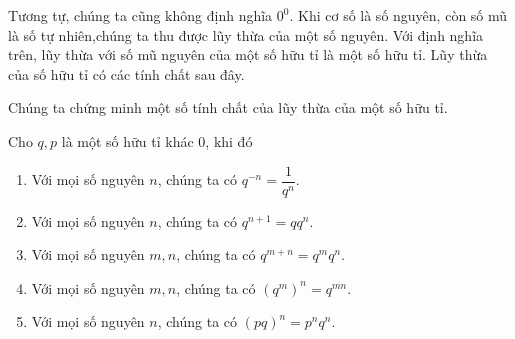 Tương tự, chúng ta cũng không định nghĩa $0^{0}$. Khi cơ số là số nguyên, còn số mũ là số tự nhiên,chúng ta thu được lũy thừa của một số nguyên. Với định nghĩa trên, lũy thừa với số mũ nguyên của một số hữu tỉ là một số hữu tỉ. Lũy thừa của số hữu tỉ có các tính chất sau đây.

Chúng ta chứng minh một số tính chất của lũy thừa của một số hữu tỉ.
\begin{theorem}
    Cho $q, p$ là một số hữu tỉ khác $0$, khi đó
    \begin{enumerate}[label={(\roman*)}]
        \item Với mọi số nguyên $n$, chúng ta có $q^{-n} = \dfrac{1}{q^{n}}$.
        \item Với mọi số nguyên $n$, chúng ta có $q^{n+1} = qq^{n}$.
        \item Với mọi số nguyên $m, n$, chúng ta có $q^{m + n} = q^{m}q^{n}$.
        \item Với mọi số nguyên $m, n$, chúng ta có ${(q^{m})}^{n} = q^{mn}$.
        \item Với mọi số nguyên $n$, chúng ta có ${(pq)}^{n} = p^{n}q^{n}$.
    \end{enumerate}
\end{theorem}

